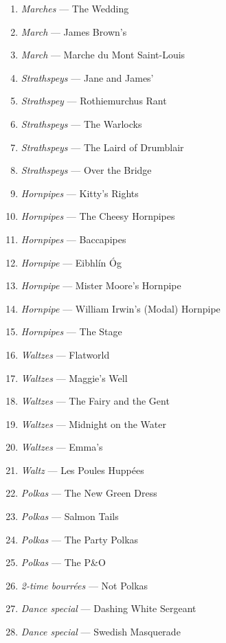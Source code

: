 \documentclass[11pt]{article}
\begin{document}
\begin{multicols*}{2}
\begin{enumerate}
        \item[] \textit{Marches} --- The Wedding
        \item[] \textit{March} --- James Brown's
        \item[] \textit{March} --- Marche du Mont Saint-Louis
        \item[] \textit{Strathspeys} --- Jane and James'
        \item[] \textit{Strathspey} --- Rothiemurchus Rant
        \item[] \textit{Strathspeys} --- The Warlocks
        \item[] \textit{Strathspeys} --- The Laird of Drumblair
        \item[] \textit{Strathspeys} --- Over the Bridge
        \item[] \textit{Hornpipes} --- Kitty's Rights
        \item[] \textit{Hornpipes} --- The Cheesy Hornpipes
        \item[] \textit{Hornpipes} --- Baccapipes
        \item[] \textit{Hornpipe} --- Eibhl\'in \'Og
        \item[] \textit{Hornpipe} --- Mister Moore's Hornpipe
        \item[] \textit{Hornpipe} --- William Irwin's (Modal) Hornpipe
        \item[] \textit{Hornpipes} --- The Stage
        \item[] \textit{Waltzes} --- Flatworld
        \item[] \textit{Waltzes} --- Maggie's Well
        \item[] \textit{Waltzes} --- The Fairy and the Gent
        \item[] \textit{Waltzes} --- Midnight on the Water
        \item[] \textit{Waltzes} --- Emma's
        \item[] \textit{Waltz} --- Les Poules Hupp\'ees
        \item[] \textit{Polkas} --- The New Green Dress
        \item[] \textit{Polkas} --- Salmon Tails
        \item[] \textit{Polkas} --- The Party Polkas
        \item[] \textit{Polkas} --- The P\&O
        \item[] \textit{2-time bourr\'ees} --- Not Polkas
        \item[] \textit{Dance special} --- Dashing White Sergeant
        \item[] \textit{Dance special} --- Swedish Masquerade
    \end{enumerate}
\end{multicols*}
\clearpage
\end{document}
